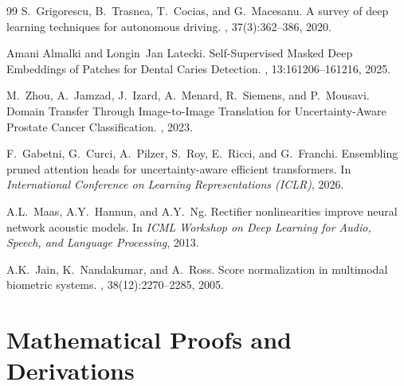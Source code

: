 \documentclass[letterpaper]{article} %
\begin{document}
\begin{thebibliography}{99}
S.~Grigorescu, B.~Trasnea, T.~Cocias, and G.~Macesanu.
\newblock A survey of deep learning techniques for autonomous driving.
, 37(3):362--386, 2020.

Amani Almalki and Longin~Jan Latecki.
\newblock Self-Supervised Masked Deep Embeddings of Patches for Dental Caries Detection.
, 13:161206--161216, 2025.

M.~Zhou, A.~Jamzad, J.~Izard, A.~Menard, R.~Siemens, and P.~Mousavi.
\newblock Domain Transfer Through Image-to-Image Translation for Uncertainty-Aware Prostate Cancer Classification.
, 2023.



F.~Gabetni, G.~Curci, A.~Pilzer, S.~Roy, E.~Ricci, and G.~Franchi.
\newblock Ensembling pruned attention heads for uncertainty-aware efficient transformers.
\newblock In {\em International Conference on Learning Representations (ICLR)}, 2026.

A.L.~Maas, A.Y.~Hannun, and A.Y.~Ng.
\newblock Rectifier nonlinearities improve neural network acoustic models.
\newblock In {\em ICML Workshop on Deep Learning for Audio, Speech, and Language Processing}, 2013.

A.K.~Jain, K.~Nandakumar, and A.~Ross.
\newblock Score normalization in multimodal biometric systems.
, 38(12):2270--2285, 2005.

\end{thebibliography}


\appendix
\section{Mathematical Proofs and Derivations}
\end{document}
